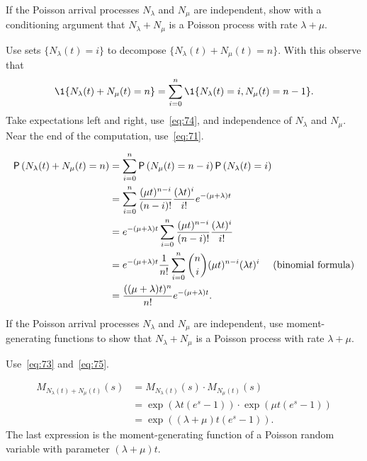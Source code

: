 \begin{exercise} 
If the Poisson arrival processes $N_\lambda$ and $N_\mu$ are independent, show with a conditioning argument that
$N_\lambda + N_\mu$ is a Poisson process with rate $\lambda + \mu$. 
\begin{hint}
 Use sets $\{N_\lambda(t) = i\}$ to decompose $\{N_\lambda(t) + N_\mu(t) = n\}$. With this observe that
 \begin{equation*}
 \1{N_\lambda(t) + N_\mu(t) = n} = 
 \sum_{i=0}^n \1{N_\lambda(t)=i, N_\mu(t) = n-1}.
 \end{equation*}
Take expectations left and right, use~\cref{eq:74}, and independence of $N_\lambda$ and $N_\mu$. Near the end of the computation, use~\cref{eq:71}.
\end{hint}
\begin{solution}
\begin{align*}\label{eq:002}
\P{N_\lambda(t) + N_\mu(t) = n} 
&= \sum_{i=0}^n \P{ N_\mu(t) = n-i}\P{N_\lambda(t)=i} \\
&= \sum_{i=0}^n \frac{(\mu t)^{n-i}}{(n-i)!} \frac{(\lambda t)^i}{i!} e^{-(\mu+\lambda)t} \\
&= e^{-(\mu+\lambda)t} \sum_{i=0}^n \frac{(\mu t)^{n-i}}{(n-i)!} \frac{(\lambda t)^i}{i!} \\
&= e^{-(\mu+\lambda)t}\frac 1{n!} \sum_{i=0}^n {n \choose i }(\mu t)^{n-i}(\lambda t)^i \quad\text{ (binomial formula)} \\
&= \frac{((\mu+\lambda)t)^n}{n!}e^{-(\mu+\lambda)t}.
 \end{align*}
\end{solution}
\end{exercise}

\begin{extra}
 If the Poisson arrival processes $N_\lambda$ and $N_\mu$ are independent, use moment-generating functions to show that $N_\lambda + N_\mu$ is a Poisson process with rate $\lambda + \mu$.
\begin{hint}
 Use~\cref{eq:73} and~\cref{eq:75}.
\end{hint}

\begin{solution}
\begin{align*}
M_{N_\lambda(t)+N_\mu(t)}(s) 
&= M_{N_\lambda(t)}(s)\cdot M_{N_{\mu}(t)}(s) \\
&=\exp(\lambda t (e^s -1))\cdot \exp(\mu t(e^s-1)) \\
&= \exp((\lambda + \mu)t (e^s-1)).
\end{align*}
The last expression is the moment-generating function of a Poisson random variable with parameter $(\lambda+\mu)t$.
\end{solution}
\end{extra}




